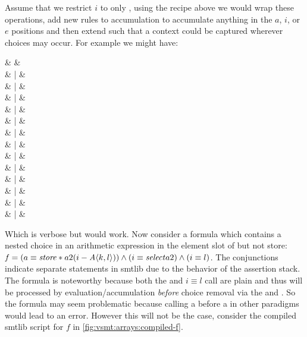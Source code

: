 Assume that we restrict $i$ to only , using the recipe above we would
wrap these operations, add new rules to accumulation to accumulate anything in
the $a$, $i$, or $e$ positions and then extend \zipper{} such that a context
could be captured wherever choices may occur. For example we might have:
%
  \begin{syntax}
    \zipper & \Coloneqq{} & \inRoot  \\[-1.8ex]
    & | & \inNot{\zipper}            \\[-1.8ex]
    & | & \inUnary{\zipper}          \\[-1.8ex]
    & | & \inBoolL{\zipper}{\,\eIL}   \\[-1.8ex]
    & | &        \\[-1.8ex]
    & | & \inArithL{\zipper}{\,\eIL}  \\[-1.8ex]
    & | &       \\[-1.8ex]
    & | & \inInEqL{\zipper}{\,\eIL}   \\[-1.8ex]
    & | &        \\[-1.8ex]
    & | &   \\[-1.8ex]
    & | &   \\[-1.8ex]
    & | &   \\[-1.8ex]
    & | &       \\[-1.8ex]
    & | &  \\
  \end{syntax}
%
  Which is verbose but would work. Now consider a formula which contains a
  nested choice in an arithmetic expression in the element slot of \select{} but
  not store: $\kf{f} = (a \equiv \store*{a}{2}{(i - \chc[A]{k,l})}) \wedge (i
  \equiv \select{a}{2}) \wedge (i \equiv l)$. The conjunctions indicate separate
  statements in \acl{smtlib} due to the behavior of the assertion stack. The
  formula is noteworthy because both the \select{} and $i \equiv l$ call are
  plain and thus will be processed by evaluation/accumulation \emph{before}
  choice removal via the \evAndL{} and \evAndR. So the formula may seem
  problematic because calling a \select{} before a \store{} in other paradigms
  would lead to an error. However this will not be the case, consider the
  compiled \acl{smtlib} script for $f$ in \autoref{fig:vsmt:arrays:compiled-f}.
%
